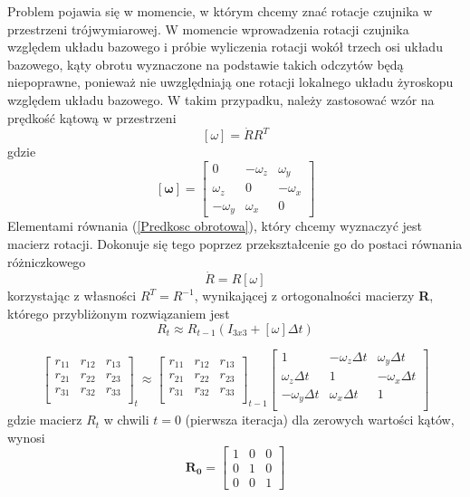 Problem pojawia się w momencie, w którym chcemy znać rotacje czujnika w przestrzeni trójwymiarowej. W momencie wprowadzenia rotacji czujnika względem układu bazowego i próbie wyliczenia rotacji wokół trzech osi układu bazowego, kąty obrotu wyznaczone na podstawie takich odczytów będą niepoprawne, ponieważ nie uwzględniają one rotacji lokalnego układu żyroskopu względem układu bazowego. W takim przypadku, należy zastosować wzór na prędkość kątową w przestrzeni \cite{Robotyka}
\begin{equation}
    \left[\omega\right] = \dot{R}R^T
    \label{Predkosc obrotowa}
\end{equation}
gdzie
$$
    \mathbf{\left[\omega\right]} = 
    \left[
    \begin{array}{ccc}
        0 & -\omega_z & \omega_y \\
        \omega_z & 0 & -\omega_x \\
        -\omega_y & \omega_x & 0
    \end{array}
    \right]
$$
Elementami równania (\ref{Predkosc obrotowa}), który chcemy wyznaczyć jest macierz rotacji. Dokonuje się tego poprzez przekształcenie go do postaci równania różniczkowego
$$
\dot{R} = R\left[\omega\right]
$$
korzystając z własności $R^T=R^{-1}$, wynikającej z ortogonalności macierzy \textbf{R}, którego przybliżonym rozwiązaniem jest
$$
    R_t \approx R_{t-1}(I_{3x3}+\left[\omega\right] \Delta t)
$$

$$
    \left[
    \begin{array}{ccc}
        r_{11} & r_{12} & r_{13} \\
        r_{21} & r_{22} & r_{23} \\
        r_{31} & r_{32} & r_{33} \\
    \end{array}
    \right]_t
    \approx
    \left[
    \begin{array}{ccc}
        r_{11} & r_{12} & r_{13} \\
        r_{21} & r_{22} & r_{23} \\
        r_{31} & r_{32} & r_{33} \\
    \end{array}
    \right]_{t-1}
    \left[
    \begin{array}{ccc}
        1 & -\omega_z\Delta t & \omega_y\Delta t \\
        \omega_z\Delta t & 1 & -\omega_x\Delta t \\
        -\omega_y\Delta t & \omega_x\Delta t & 1 \\
    \end{array}
    \right]
$$
gdzie macierz $R_t$ w chwili $t=0$ (pierwsza iteracja) dla zerowych wartości kątów, wynosi
$$
    \mathbf{R_{0}} =
    \left[
    \begin{array}{ccc}
        1 & 0 & 0 \\
        0 & 1 & 0 \\
        0 & 0 & 1
    \end{array}
    \right]
$$


